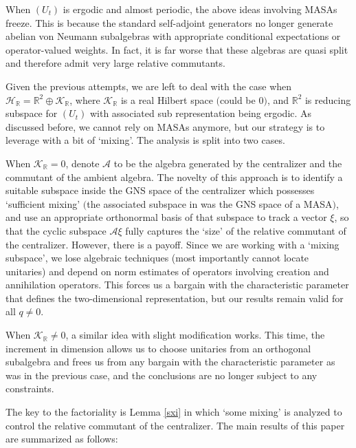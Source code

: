 \documentclass[12pt, a4paper,reqno]{amsart}
\theoremstyle{definition}
\def\R{\mathbb R}
\newcommand{\CH}{\mathcal{H}}
\begin{document}
When $(U_t)$ is ergodic and almost periodic, the above ideas involving MASAs freeze. This is because the standard self-adjoint generators no longer generate abelian von Neumann subalgebras with appropriate conditional expectations or operator-valued weights. In fact, it is far worse that these algebras are quasi split \cite{BM2} and therefore admit very large relative commutants. 

Given the previous attempts, we are left to deal with the case when $\CH_\R= \mathbb{R}^2\oplus \mathcal{K}_\R$, where $\mathcal{K}_\R$ is a real Hilbert space $($could be $0)$, and $\mathbb{R}^2$ is reducing subspace for $(U_t)$ with associated sub representation being ergodic. As discussed before, we cannot rely on MASAs anymore, but our strategy is to leverage with a bit of `mixing'. The analysis is split into two cases.

When $\mathcal{K}_\R=0$, denote $\mathcal{A}$ to be the algebra generated by the centralizer and the commutant of the ambient algebra. The novelty of this approach is to identify a suitable subspace inside the GNS space of the centralizer which possesses `sufficient mixing' $($the associated subspace in \cite{bik-kunal, ER} was the GNS space of a MASA$)$, and use an appropriate orthonormal basis of that subspace to track a vector $\xi$, so that the cyclic subspace $\mathcal{A}\xi$ fully captures the `size' of the relative commutant of the centralizer. However, there is a payoff. Since we are working with a  `mixing subspace', we lose algebraic techniques (most importantly cannot locate unitaries) and depend on norm estimates of operators involving creation and annihilation operators. This forces us a bargain with the characteristic parameter that defines the two-dimensional representation, but our results remain valid for all $q\neq 0$. 

When $\mathcal{K}_\R\neq 0$, a similar idea with slight modification works. This time, the increment in dimension allows us to choose unitaries from an orthogonal subalgebra and frees us from any bargain with the characteristic parameter as was in the previous case, and the conclusions are no longer subject to any constraints. 

The key to the factoriality is Lemma \ref{sxi} in which `some mixing' is analyzed to control the relative commutant of the centralizer. The main results of this paper are summarized as follows:  \\ 
\end{document}
